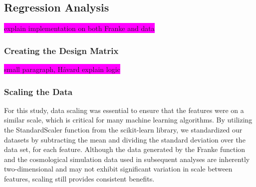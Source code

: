 \documentclass[aps,pra,english,notitlepage,reprint,nofootinbib]{revtex4-1}  %
\begin{document}



\subsection{Regression Analysis}
\colorbox{magenta}{explain implementation on both Franke and data}
\subsubsection{Creating the Design Matrix}
\colorbox{magenta}{small paragraph, Håvard explain logic}

\subsubsection{Scaling the Data}
For this study, data scaling was essential to ensure that the features were on a similar scale, which is critical for many machine learning algorithms. By utilizing the StandardScaler function from the scikit-learn library, we standardized our datasets by subtracting the mean and dividing the standard deviation over the data set, for each feature. Although the data generated by the Franke function and the cosmological simulation data used in subsequent analyses are inherently two-dimensional and may not exhibit significant variation in scale between features, scaling still provides consistent benefits. 
\end{document}

